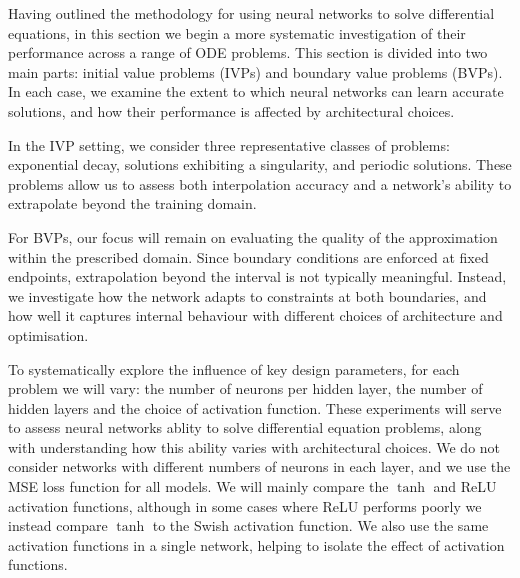 Having outlined the methodology for using neural networks to solve differential equations, in this 
section we begin a more systematic investigation of their performance across a range of ODE problems.
This section is divided into two main parts: initial value problems (IVPs) and boundary value problems
(BVPs). In each case, we examine the extent to which neural networks can learn accurate solutions, 
and how their performance is affected by architectural choices.

In the IVP setting, we consider three representative classes of problems: exponential decay,
solutions exhibiting a singularity, and periodic solutions. These problems allow us to assess 
both interpolation accuracy and a network's ability to extrapolate beyond the training domain.

For BVPs, our focus will remain on evaluating the quality of the approximation within the 
prescribed domain. Since boundary conditions are enforced at fixed endpoints, extrapolation 
beyond the interval is not typically meaningful. Instead, we investigate how the network adapts
to constraints at both boundaries, and how well it captures internal behaviour with different
choices of architecture and optimisation.

To systematically explore the influence of key design parameters, for each problem we will vary: 
the number of neurons per hidden layer, the number of hidden layers and the choice of activation 
function. These experiments will serve to assess neural networks ablity to solve differential 
equation problems, along with understanding how this ability varies with architectural choices. 
We do not consider networks with different numbers of neurons in each layer, and we use the MSE
loss function for all models. We will mainly compare the $\tanh$ and ReLU activation functions,
although in some cases where ReLU performs poorly we instead compare $\tanh$ to the Swish
activation function. We also use the same activation functions in a single network, helping to 
isolate the effect of activation functions.

